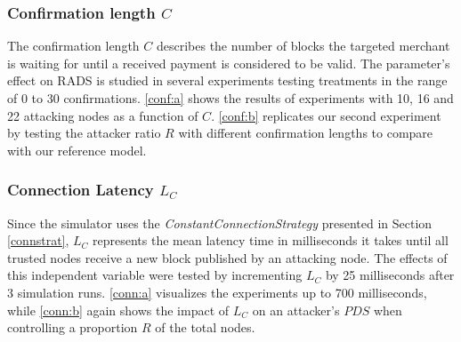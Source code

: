 \documentclass[a4paper,12pt,twoside]{report}
\begin{document}
\subsubsection{Confirmation length $C$} \label{consres}
The confirmation length $C$ describes the number of blocks the targeted merchant is waiting for until a received payment is considered to be valid. The parameter's effect on RADS is studied in several experiments testing treatments in the range of 0 to 30 confirmations. \autoref{conf:a} shows the results of experiments with 10, 16 and 22 attacking nodes as a function of $C$. \autoref{conf:b} replicates our second experiment by testing the attacker ratio $R$ with different confirmation lengths to compare with our reference model.

\subsubsection{Connection Latency $L_C$}
Since the simulator uses the \textit{ConstantConnectionStrategy} presented in Section \ref{connstrat}, $L_C$ represents the mean latency time in milliseconds it takes until all trusted nodes receive a new block published by an attacking node. The effects of this independent variable were tested by incrementing $L_C$ by 25 milliseconds after 3 simulation runs. \autoref{conn:a} visualizes the experiments up to 700 milliseconds, while \autoref{conn:b} again shows the impact of $L_C$ on an attacker's $PDS$ when controlling a proportion $R$ of the total nodes.
\end{document}
